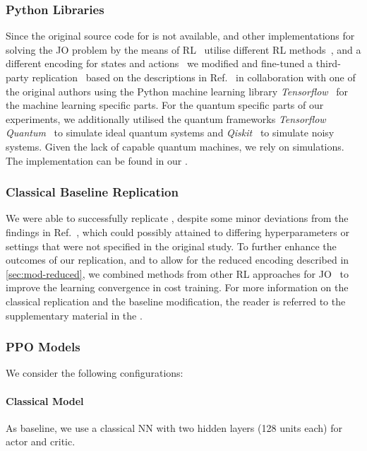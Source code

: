 \documentclass[10pt, conference]{IEEEtran}
\begin{document}
\subsubsection{Python Libraries}
Since the original source code for \rj is not available, and other implementations for solving the JO problem by the means of RL~\cite{rtos_impl, yang22, marcus21} utilise different RL methods~\cite{mnih13}, and a different encoding for states and actions~\cite{marcus21, yang22} we modified and fine-tuned a third-party replication~\cite{rejoin_impl} based on the descriptions in Ref.~\cite{marcus18} in collaboration with one of the original authors using the Python machine learning library \emph{Tensorflow}~\cite{abadi15} for the machine learning specific parts.
For the quantum specific parts of our experiments, we additionally utilised the quantum frameworks \emph{Tensorflow Quantum}~\cite{broughton21} to simulate ideal quantum systems and \emph{Qiskit}~\cite{qiskit} to simulate noisy systems.
Given the lack of capable quantum machines, we rely on simulations.
The implementation can be found in our \repro.

\subsubsection{Classical Baseline Replication}
We were able to successfully replicate \rj, despite some minor deviations from the findings in Ref.~\cite{marcus18}, which could possibly attained to differing hyperparameters or settings that were not specified in the original study.
To further enhance the outcomes of our replication, and to allow for the reduced encoding described in \autoref{sec:mod-reduced}, we combined methods from other RL approaches for JO~\cite{krishnan18, xiang20} to improve the learning convergence in cost training.
For more information on the classical replication and the baseline modification, the reader is referred to the supplementary material in the \repro.

\subsubsection{PPO Models}
We consider the following configurations:

\paragraph{Classical Model}
As baseline, we use a classical NN with two hidden layers (128 units each) for actor and critic.
\end{document}
